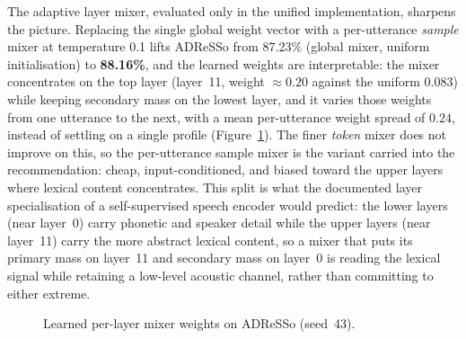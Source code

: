 The adaptive layer mixer, evaluated only in the unified implementation, sharpens the picture. Replacing the single global weight vector with a per-utterance \emph{sample} mixer at temperature 0.1 lifts ADReSSo from 87.23\% (global mixer, uniform initialisation) to \textbf{88.16\%}, and the learned weights are interpretable: the mixer concentrates on the top layer (layer~11, weight $\approx 0.20$ against the uniform 0.083) while keeping secondary mass on the lowest layer, and it varies those weights from one utterance to the next, with a mean per-utterance weight spread of $0.24$, instead of settling on a single profile (Figure~\ref{fig:res_layer_mixer}). The finer \emph{token} mixer does not improve on this, so the per-utterance sample mixer is the variant carried into the recommendation: cheap, input-conditioned, and biased toward the upper layers where lexical content concentrates. This split is what the documented layer specialisation of a self-supervised speech encoder would predict: the lower layers (near layer~0) carry phonetic and speaker detail while the upper layers (near layer~11) carry the more abstract lexical content, so a mixer that puts its primary mass on layer~11 and secondary mass on layer~0 is reading the lexical signal while retaining a low-level acoustic channel, rather than committing to either extreme.

\begin{figure}[htbp]
\centering
{}
\caption[Learned layer-mixer weights]{Learned per-layer mixer weights on ADReSSo (seed~43).}
\label{fig:res_layer_mixer}
\end{figure}

